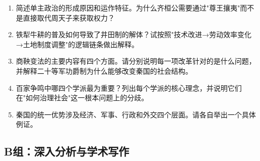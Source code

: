 \documentclass[a4paper,12pt]{ctexart}
\begin{document}
\begin{enumerate}[label=A\arabic*.]
  \item 简述单主政治的形成原因和运作特征。为什么齐桓公需要通过"尊王攘夷"而不是直接取代周天子来获取权力？
  \item 铁犁牛耕的普及如何导致了井田制的解体？试按照"技术改进→劳动效率变化→土地制度调整"的逻辑链条做出解释。
  \item 商鞅变法的主要内容有四个方面。请分别说明每一项改革针对的是什么问题，并解释二十等军功爵制为什么能够改变秦国的社会结构。
  \item 百家争鸣中哪四个学派最为重要？列出每个学派的核心理念，并说明它们在"如何治理社会"这一根本问题上的分歧。
  \item 秦国的统一优势涉及经济、军事、行政和外交四个层面。请各自举出一个具体例证。
\end{enumerate}

\subsection*{B组：深入分析与学术写作}
\end{document}
